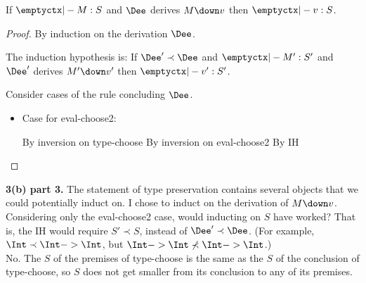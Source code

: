 \begin{conjecture}
  If $\emptyctx |- M : S$
  and $\Dee$ derives $M \down v$
  then
  $\emptyctx |- v : S$.
\end{conjecture}
\begin{proof}
  By induction on the derivation $\Dee$.

  The induction hypothesis is:
  If $\Dee' \prec \Dee$ and $\emptyctx |- M' : S'$
  and $\Dee'$ derives $M' \down v'$
  then $\emptyctx |- v' : S'$.

  Consider cases of the rule concluding $\Dee$.

  \begin{itemize}
  \item Case for eval-choose2:
  
  \begin{llproof}
        {By inversion on type-choose}
        {By inversion on eval-choose2}
        {By IH}
  \end{llproof}

\vfill
  \end{itemize}
\end{proof}


\textbf{3(b) part 3.}
The statement of type preservation contains several objects that we could potentially induct on.
I chose to induct on the derivation of $M \down v$.
Considering only the eval-choose2 case, would inducting on $S$
have worked?  That is, the IH would require $S' \prec S$, instead of $\Dee' \prec \Dee$.
(For example, $\Int \prec \Int -> \Int$, but $\Int -> \Int \not\prec \Int -> \Int$.)\\

No. The $S$ of the premises of type-choose is the same as the $S$ of the conclusion of type-choose, so $S$ does not get smaller from its conclusion to any of its premises.

\vspace*{15ex}







